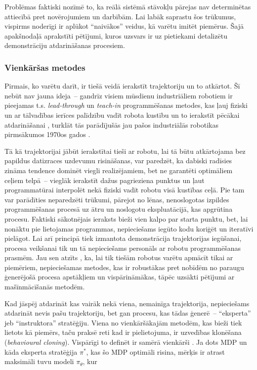 \documentclass[12pt, a4paper]{article}
\numberwithin{equation}{section} %
\begin{document}
Problēmas faktiski nozīmē to, ka reālā sistēmā stāvokļu pārejas nav determinētas attiecībā pret novērojumiem un darbībām. Lai labāk saprastu šos trūkumus, vispirms noderīgi ir aplūkot ``naivākos'' veidus, kā varētu imitēt piemērus. Šajā apakšnodaļā aprakstīti pētījumi, kuros uzsvars ir uz pietiekami detalizētu demonstrāciju atdarināšanas procesiem.

\subsubsection{Vienkāršas metodes}

Pirmais, ko varētu darīt, ir tiešā veidā ierakstīt trajektoriju un to atkārtot. Šī nebūt nav jauna ideja~-- gandrīz visiem mūsdienu industriāliem robotiem ir pieejamas t.s. \textit{lead-through} un \textit{teach-in} programmēšanas metodes, kas ļauj fiziski un ar tālvadības ierīces palīdzību vadīt robota kustību un to ierakstīt pēcākai atdarināšanai \cite{teach_pendant}, turklāt tās parādījušās jau pašos industriālās robotikas pirmsākumos 1970os gados \cite{abb2016special}.

Tā kā trajektorijai jābūt ierakstītai tieši ar robotu, lai tā būtu atkārtojama bez papildus datizraces uzdevumu risināšanas, var paredzēt, ka dabiski radīsies zināma tendence dominēt viegli realizējamiem, bet ne garantēti optimāliem ceļiem telpā~-- vieglāk ierakstīt dažus pagrieziena punktus un ļaut programmatūrai interpolēt nekā fiziski vadīt robotu visā kustības ceļā. Pie tam var parādīties neparedzēti trūkumi, pārejot no lēnas, nenoslogotas izpildes programmēšanas procesā uz ātru un noslogotu ekspluatācijā, kas apgrūtina procesu. Faktiski sākotnējais ieraksts bieži vien kalpo par starta punktu, bet, lai nonāktu pie lietojamas programmas, nepieciešams iegūto kodu koriģēt un iteratīvi pielāgot. Lai arī principā tiek izmantota demonstrācija trajektorijas iegūšanai, procesa veikšanai tik un tā nepieciešams personāls ar robotu programmēšanas prasmēm. Jau sen atzīts \cite{muench1994robot,billard2008handbook}, ka, lai tik tiešām robotus varētu apmācīt tikai ar piemēriem, nepieciešamas metodes, kas ir robustākas pret nobīdēm no paraugu ģenerējošā procesa apstākļiem un vispārināmākas, tāpēc uzsākti pētījumi ar mašīnmācīšanās metodēm.

Kad jāspēj atdarināt kas vairāk nekā viena, nemainīga trajektorija, nepieciešams atdarināt nevis pašu trajektoriju, bet gan procesu, kas tādas ģenerē~-- ``eksperta'' jeb ``instruktora'' stratēģiju. Viena no vienkāršākajām metodēm, kas bieži tiek lietots kā piemērs, taču praksē reti kad ir pielietojuma, ir uzvedības klonēšana (\textit{behavioural cloning}). Vispārīgi to definēt ir samērā vienkārši \cite{attia2018global}. Ja dots MDP un kāda eksperta stratēģija $\pi^*$, kas šo MDP optimāli risina, mērķis ir atrast maksimāli tuvu modeli $\pi_{\theta}$, kur
\end{document}
